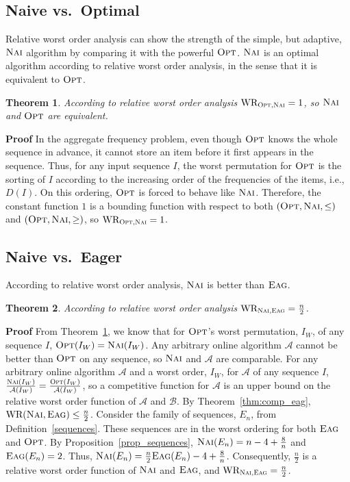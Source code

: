 \documentclass[11pt]{article}
\newtheorem{xtheorem}{Theorem}
\newenvironment{theorem}{\begin{xtheorem}\rm}{\end{xtheorem}}
\newenvironment{proof}{\begin{trivlist}\item[]{\bf Proof }}{\hspace*{\fill}\raisebox{-1pt}{\boldmath$\Box$}\end{trivlist}}
\newcommand{\opt}{{\ensuremath{\textsc{Opt}}}\xspace}
\newcommand{\nav}{{\ensuremath{\textsc{Nai}}}\xspace}
\newcommand{\eag}{{\ensuremath{\textsc{Eag}}}\xspace}
\newcommand{\algA}{{\ensuremath{\mathcal{A}}}\xspace}
\newcommand{\algB}{{\ensuremath{\mathcal{B}}}\xspace}
\DeclareMathOperator{\WR}{\textrm{WR}}
\begin{document}
\subsection{Naive vs.\ Optimal}\label{subsec:relwor_nav_opt}
Relative worst order analysis can show the strength of the simple, but
adaptive, \nav algorithm by comparing it with the powerful \opt.
\nav is an optimal algorithm according to relative worst order
analysis, in the sense that it is equivalent to \opt.
\begin{theorem}\label{thm:relwor_nav_opt}
According to relative worst order analysis $\WR_{\opt,\nav}=1$, so \nav and \opt are equivalent.
\end{theorem}
\begin{proof}
In the aggregate frequency problem, even though \opt knows the whole sequence in advance, it cannot store an item before it first appears in
the sequence.
Thus, for any input sequence $I$, the worst permutation for \opt is the sorting of $I$ according to the increasing order of the frequencies of the items, i.e., $D(I)$.
On this ordering, \opt is forced to behave like \nav.
Therefore, the constant function $1$ is a bounding function with
respect to both $(\opt,\nav,\leq)$ and $(\opt,\nav,\geq)$, so
$\WR_{\opt,\nav}=1$.
\end{proof}





\subsection{Naive vs.\ Eager}

According to relative worst order analysis, \nav is better than \eag.

\begin{theorem}\label{thm:relwor_nav_eag}
 According to relative worst order analysis $\WR_{{\nav},{\eag}} = \frac{n}{2}$.
\end{theorem}
\begin{proof}
From Theorem~\ref{thm:relwor_nav_opt}, we know that for \opt's worst 
permutation, $I_W$, of any sequence $I$, $\opt(I_W) = \nav(I_W)$.
Any arbitrary online algorithm $\algA$
cannot be better than \opt on any sequence, so \nav and \algA are 
comparable.
For any arbitrary online
algorithm $\algA$ and a worst order, $I_W$, for \algA of any sequence $I$, 
$\frac{\nav(I_W)}{\algA(I_W)} = \frac{\opt(I_W)}{\algA(I_W)}$, so
a competitive function for \algA is an upper bound on the relative worst order
function of \algA and \algB.
By Theorem~\ref{thm:comp_eag}, $\WR(\nav,\eag)\leq \frac{n}{2}$.
Consider the family of sequences, $E_n$, from Definition~\ref{sequences}. These sequences are in the worst ordering for both \eag and \opt.
By Proposition~\ref{prop_sequences}, $\nav(E_n) = n-4+\frac{8}{n}$ and $\eag(E_n)=2$.
Thus, $\nav(E_n) = \frac{n}{2}\eag(E_n) -4 + \frac{8}{n}$.
Consequently,
$\frac{n}{2}$ is a relative worst order function of \nav and \eag,
and $\WR_{{\nav},{\eag}} = \frac{n}{2}$.
\end{proof}
\end{document}
